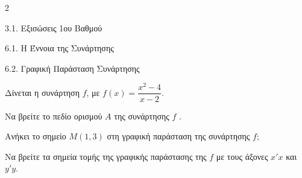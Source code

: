 
\begin{ylh}{2}
    \item 3.1. Εξισώσεις 1ου Βαθμού
    \item 6.1. Η Έννοια της Συνάρτησης
    \item 6.2. Γραφική Παράσταση Συνάρτησης
\end{ylh}
Δίνεται η συνάρτηση $f$, με $f(x) = \dfrac{x^2-4}{x-2}$.
\begin{alist}
\item Να βρείτε το πεδίο ορισμού $A$ της συνάρτησης $f$ .
\item Ανήκει το σημείο $M(1, 3)$ στη γραφική παράσταση της συνάρτησης $f$;
\item Να βρείτε τα σημεία τομής της γραφικής παράστασης της $f$ με τους άξονες $x'x$ και $y'y$.

\end{alist}

